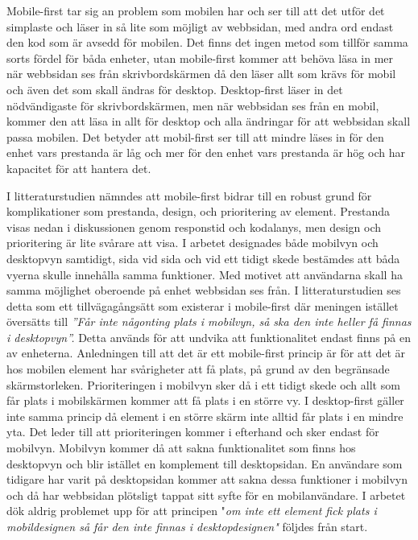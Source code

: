 \documentclass[11pt]{article}
\begin{document}
Mobile-first tar sig an problem som mobilen har och ser till att det utför det simplaste och läser in så lite som möjligt av webbsidan, med andra ord endast den kod som är avsedd för mobilen. Det finns det ingen metod som tillför samma sorts fördel för båda enheter, utan mobile-first kommer att behöva läsa in mer när webbsidan ses från skrivbordskärmen då den läser allt som krävs för mobil och även det som skall ändras för desktop. Desktop-first läser in det nödvändigaste för skrivbordskärmen, men när webbsidan ses från en mobil, kommer den att läsa in allt för desktop och alla ändringar för att webbsidan skall passa mobilen. Det betyder att mobil-first ser till att mindre läses in för den enhet vars prestanda är låg och mer för den enhet vars prestanda är hög och har kapacitet för att hantera det.

I litteraturstudien nämndes att mobile-first bidrar till en robust grund för komplikationer som prestanda, design, och prioritering av element. Prestanda visas nedan i diskussionen genom responstid och kodalanys, men design och prioritering är lite svårare att visa. I arbetet designades både mobilvyn och desktopvyn samtidigt, sida vid sida och vid ett tidigt skede bestämdes att båda vyerna skulle innehålla samma funktioner. Med motivet att användarna skall ha samma möjlighet oberoende på enhet webbsidan ses från. I litteraturstudien ses detta som ett tillvägagångsätt som existerar i mobile-first där meningen istället översätts till \textit{”Får inte någonting plats i mobilvyn, så ska den inte heller få finnas i desktopvyn”.} Detta används för att undvika att funktionalitet endast finns på en av enheterna. Anledningen till att det är ett mobile-first princip är för att det är hos mobilen element har svårigheter att få plats, på grund av den begränsade skärmstorleken. Prioriteringen i mobilvyn sker då i ett tidigt skede och allt som får plats i mobilskärmen kommer att få plats i en större vy. I desktop-first gäller inte samma princip då element i en större skärm inte alltid får plats i en mindre yta. Det leder till att prioriteringen kommer i efterhand och sker endast för mobilvyn. Mobilvyn kommer då att sakna funktionalitet som finns hos desktopvyn och blir istället en komplement till desktopsidan. En användare som tidigare har varit på desktopsidan kommer att sakna dessa funktioner i mobilvyn och då har webbsidan plötsligt tappat sitt syfte för en mobilanvändare. I arbetet dök aldrig problemet upp för att principen "\textit{om inte ett element fick plats i mobildesignen så får den inte finnas i desktopdesignen"} följdes från start.
\end{document}
